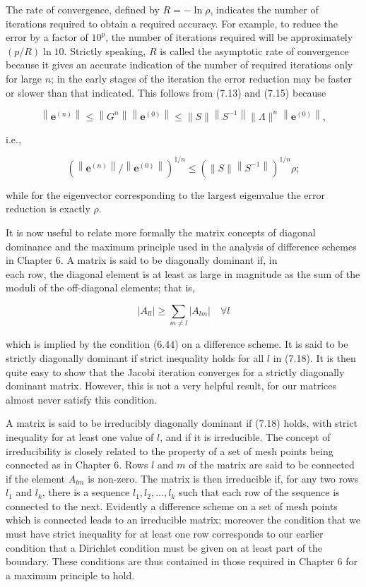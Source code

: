 \documentclass[10pt]{article}
\begin{document}
The rate of convergence, defined by \(R=-\ln \rho\), indicates the number of iterations required to obtain a required accuracy. For example, to reduce the error by a factor of \(10^{p}\), the number of iterations required will be approximately \((p / R) \ln 10\). Strictly speaking, \(R\) is called the asymptotic rate of convergence because it gives an accurate indication of the number of required iterations only for large \(n\); in the early stages of the iteration the error reduction may be faster or slower than that indicated. This follows from (7.13) and (7.15) because

\[
\left\|\mathbf{e}^{(n)}\right\| \leq\left\|G^{n}\right\|\left\|\mathbf{e}^{(0)}\right\| \leq\|S\|\left\|S^{-1}\right\|\|\Lambda\|^{n}\left\|\mathbf{e}^{(0)}\right\|,
\]

i.e.,

\[
\left(\left\|\mathbf{e}^{(n)}\right\| /\left\|\mathbf{e}^{(0)}\right\|\right)^{1 / n} \leq\left(\|S\|\left\|S^{-1}\right\|\right)^{1 / n} \rho ;
\]

while for the eigenvector corresponding to the largest eigenvalue the error reduction is exactly \(\rho\).

It is now useful to relate more formally the matrix concepts of diagonal dominance and the maximum principle used in the analysis of difference schemes in Chapter 6. A matrix is said to be diagonally dominant if, in\\
each row, the diagonal element is at least as large in magnitude as the sum of the moduli of the off-diagonal elements; that is,

\[
\left|A_{l l}\right| \geq \sum_{m \neq l}\left|A_{l m}\right| \quad \forall l
\]

which is implied by the condition (6.44) on a difference scheme. It is said to be strictly diagonally dominant if strict inequality holds for all \(l\) in (7.18). It is then quite easy to show that the Jacobi iteration converges for a strictly diagonally dominant matrix. However, this is not a very helpful result, for our matrices almost never satisfy this condition.

A matrix is said to be irreducibly diagonally dominant if (7.18) holds, with strict inequality for at least one value of \(l\), and if it is irreducible. The concept of irreducibility is closely related to the property of a set of mesh points being connected as in Chapter 6. Rows \(l\) and \(m\) of the matrix are said to be connected if the element \(A_{l m}\) is non-zero. The matrix is then irreducible if, for any two rows \(l_{1}\) and \(l_{k}\), there is a sequence \(l_{1}, l_{2}, \ldots, l_{k}\) such that each row of the sequence is connected to the next. Evidently a difference scheme on a set of mesh points which is connected leads to an irreducible matrix; moreover the condition that we must have strict inequality for at least one row corresponds to our earlier condition that a Dirichlet condition must be given on at least part of the boundary. These conditions are thus contained in those required in Chapter 6 for a maximum principle to hold.
\end{document}
